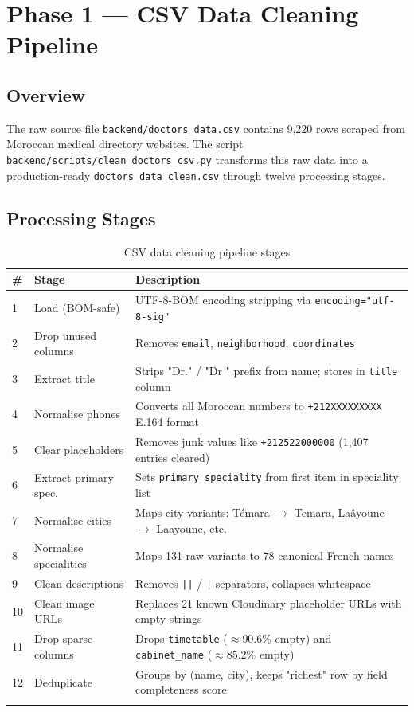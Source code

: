 \documentclass[12pt, a4paper]{article}
\newcommand{\file}[1]{\texttt{\color{accent}#1}}
\newcommand{\col}[1]{\texttt{\color{teal}#1}}
\begin{document}
\section{Phase 1 — CSV Data Cleaning Pipeline}

\subsection{Overview}

The raw source file \file{backend/doctors\_data.csv} contains 9,220 rows scraped
from Moroccan medical directory websites. The script
\file{backend/scripts/clean\_doctors\_csv.py} transforms this raw data into a
production-ready \file{doctors\_data\_clean.csv} through twelve processing stages.

\subsection{Processing Stages}

\begin{longtable}{p{0.4cm} p{3.8cm} p{9.2cm}}
  \toprule
  \textbf{\#} & \textbf{Stage} & \textbf{Description} \\
  \midrule
  1  & Load (BOM-safe)        & UTF-8-BOM encoding stripping via \texttt{encoding="utf-8-sig"} \\[3pt]
  2  & Drop unused columns    & Removes \texttt{email}, \texttt{neighborhood}, \texttt{coordinates} \\[3pt]
  3  & Extract title          & Strips "Dr." / "Dr " prefix from name; stores in \col{title} column \\[3pt]
  4  & Normalise phones       & Converts all Moroccan numbers to \texttt{+212XXXXXXXXX} E.164 format \\[3pt]
  5  & Clear placeholders     & Removes junk values like \texttt{+212522000000} (1,407 entries cleared) \\[3pt]
  6  & Extract primary spec.  & Sets \col{primary\_speciality} from first item in speciality list \\[3pt]
  7  & Normalise cities       & Maps city variants: Témara $\to$ Temara, Laâyoune $\to$ Laayoune, etc. \\[3pt]
  8  & Normalise specialities & Maps 131 raw variants to 78 canonical French names \\[3pt]
  9  & Clean descriptions     & Removes \texttt{||} / \texttt{|} separators, collapses whitespace \\[3pt]
  10 & Clean image URLs       & Replaces 21 known Cloudinary placeholder URLs with empty strings \\[3pt]
  11 & Drop sparse columns    & Drops \col{timetable} ($\approx$90.6\% empty) and \col{cabinet\_name} ($\approx$85.2\% empty) \\[3pt]
  12 & Deduplicate            & Groups by (name, city), keeps "richest" row by field completeness score \\
  \bottomrule
  \caption{CSV data cleaning pipeline stages}
  \label{tab:etl_stages}
\end{longtable}
\end{document}
